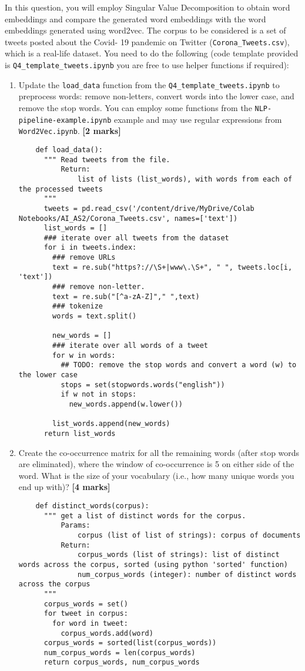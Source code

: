 \item In this question, you will employ Singular Value Decomposition to obtain word embeddings and compare the generated word embeddings with the word embeddings generated using word2vec. The corpus to be considered is a set of tweets posted about the Covid- 19 pandemic on Twitter (\lstinline{Corona_Tweets.csv}), which is a real-life dataset. You need to do the following (code template provided is \lstinline{Q4_template_tweets.ipynb} you are free to use helper functions if required):\\
\begin{enumerate}
  \item Update the \lstinline{load_data} function from the \lstinline{Q4_template_tweets.ipynb} to preprocess words: remove non-letters, convert words into the lower case, and remove the stop words. You can employ some functions from the \lstinline{NLP-pipeline-example.ipynb} example and may use regular expressions from \lstinline{Word2Vec.ipynb}. {\bf [2 marks]}
        \begin{lstlisting}
    def load_data():
      """ Read tweets from the file.
          Return:
              list of lists (list_words), with words from each of the processed tweets
      """
      tweets = pd.read_csv('/content/drive/MyDrive/Colab Notebooks/AI_AS2/Corona_Tweets.csv', names=['text'])
      list_words = []
      ### iterate over all tweets from the dataset
      for i in tweets.index:
        ### remove URLs
        text = re.sub("https?://\S+|www\.\S+", " ", tweets.loc[i, 'text'])
        ### remove non-letter.
        text = re.sub("[^a-zA-Z]"," ",text)
        ### tokenize
        words = text.split()
        
        new_words = []
        ### iterate over all words of a tweet
        for w in words:
          ## TODO: remove the stop words and convert a word (w) to the lower case
          stops = set(stopwords.words("english"))
          if w not in stops:
            new_words.append(w.lower())
          
        list_words.append(new_words)
      return list_words
  \end{lstlisting}
  \item Create the co-occurrence matrix for all the remaining words (after stop words are eliminated), where the window of co-occurrence is 5 on either side of the word. What is the size of your vocabulary (i.e., how many unique words you end up with)? \textbf{[4 marks]}
        \begin{lstlisting}
    def distinct_words(corpus):
      """ get a list of distinct words for the corpus.
          Params:
              corpus (list of list of strings): corpus of documents
          Return:
              corpus_words (list of strings): list of distinct words across the corpus, sorted (using python 'sorted' function)
              num_corpus_words (integer): number of distinct words across the corpus
      """
      corpus_words = set()
      for tweet in corpus:
        for word in tweet:
          corpus_words.add(word)
      corpus_words = sorted(list(corpus_words))
      num_corpus_words = len(corpus_words)
      return corpus_words, num_corpus_words


\end{lstlisting}
\end{enumerate}
